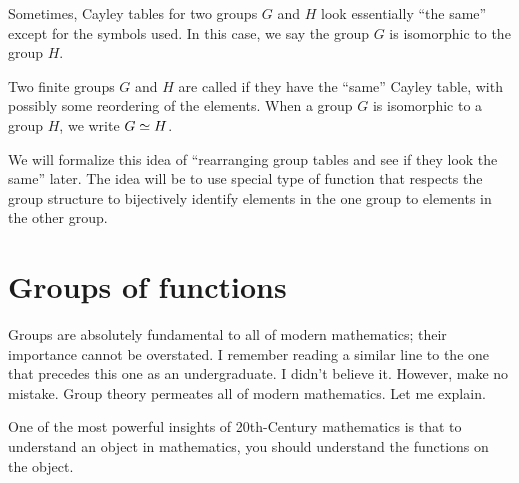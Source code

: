 \documentclass{ximera}
\begin{document}


Sometimes, Cayley tables for two groups $G$ and $H$ look essentially
``the same'' except for the symbols used. In this case, we say the
group $G$ is isomorphic to the group $H$.

\begin{definition}
  Two finite groups $G$ and $H$ are called  if
  they have the ``same'' Cayley table, with possibly some reordering
  of the elements. When a group $G$ is isomorphic to a group $H$, we
  write $G\simeq H$.
\end{definition}

We will formalize this idea of ``rearranging group tables and see if
they look the same'' later. The idea will be to use special type of
function that respects the group structure to bijectively identify
elements in the one group to elements in the other group.

\section{Groups of functions}

Groups are absolutely fundamental to all of modern mathematics; their
importance cannot be overstated. I remember reading a similar line to
the one that precedes this one as an undergraduate. I didn't believe
it. However, make no mistake. Group theory permeates all of modern
mathematics. Let me explain.

One of the most powerful insights of 20th-Century mathematics is that
to understand an object in mathematics, you should understand the
functions on the object.
\end{document}
